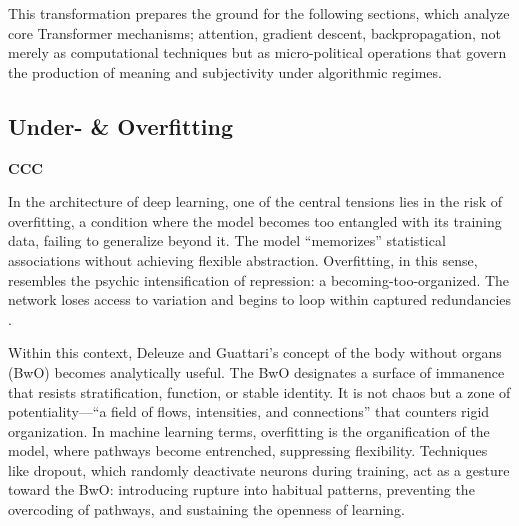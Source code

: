 This transformation prepares the ground for the following sections, which analyze core Transformer mechanisms; attention, gradient descent, backpropagation, not merely as computational techniques but as micro-political operations that govern the production of meaning and subjectivity under algorithmic regimes.


\subsection{Under- \& Overfitting}




\begin{orangebox}
	\textbf{CCC}
\end{orangebox}

In the architecture of deep learning, one of the central tensions lies in the risk of overfitting, a condition where the model becomes too entangled with its training data, failing to generalize beyond it. The model “memorizes” statistical associations without achieving flexible abstraction. Overfitting, in this sense, resembles the psychic intensification of repression: a becoming-too-organized. The network loses access to variation and begins to loop within captured redundancies \parencite[]{srivastava2014} .

Within this context, Deleuze and Guattari’s concept of the body without organs (BwO) becomes analytically useful. The BwO designates a surface of immanence that resists stratification, function, or stable identity. It is not chaos but a zone of potentiality—“a field of flows, intensities, and connections” that counters rigid organization. In machine learning terms, overfitting is the organification of the model, where pathways become entrenched, suppressing flexibility. Techniques like dropout, which randomly deactivate neurons during training, act as a gesture toward the BwO: introducing rupture into habitual patterns, preventing the overcoding of pathways, and sustaining the openness of learning.

